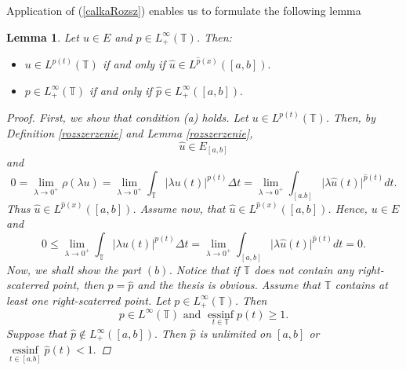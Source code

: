 \documentclass[12pt,a4paper,oneside,titlepage]{article}
\newtheorem{Lemat}{Lemma}
\newcommand{\essinf}{\operatorname{essinf}\limits}
\begin{document}
\smallskip
\begin{flushleft}
Application of (\ref{calkaRozsz}) enables us to formulate the following lemma
\end{flushleft}
\begin{Lemat} Let $u \in E$ and $p \in L^{\infty}_{+}(\mathbb{T})$. Then:
\begin{itemize}
\item[(a)] $u \in L^{p(t)}(\mathbb{T}) $ if and only if $ \widehat{u} \in L^{\widehat{p}(x)}([a,b]). $
\item[(b)] $p \in L^{\infty}_+ (\mathbb{T}) $ if and only if $ \widehat{p} \in L^{\infty}_+([a,b]). $

\end{itemize}

\begin{proof}
First, we show that condition (a) holds. Let $ u \in L^{p(t)}(\mathbb{T}) $. Then, by Definition \ref{rozszerzenie} and Lemma \ref{rozszerzenie},
\begin{equation}
\nonumber
\widehat{u} \in E_{[a,b]}
\end{equation}
 and
\begin{equation}
\nonumber
0 = \lim_{\lambda \rightarrow 0^{+}} \rho(\lambda u ) = \lim_{\lambda \rightarrow 0^{+}} \int_{\mathbb{T}} \vert \lambda u(t) \vert^{p(t)} \Delta t = \lim_{\lambda \rightarrow 0^{+}} \int_{[a.b]} \vert \lambda \widehat{u}(t) \vert^{\widehat{p}(t)} dt.
\end{equation}
Thus $\widehat{u} \in L^{\widehat{p}(x)}([a,b])$. 
Assume now, that $\widehat{u} \in L^{\widehat{p}(x)}([a,b]) $. Hence, $u \in E$ and 
\begin{equation}
\nonumber
0 \leq \lim_{\lambda \rightarrow 0^{+}} \int_{\mathbb{T}} \vert \lambda u(t) \vert^{p(t)} \Delta t =
\lim_{\lambda \rightarrow 0^{+}} \int_{[a,b]} \vert \lambda \widehat{u}(t) \vert^{\widehat{p}(t)} dt = 0. 
\end{equation} 
\indent
Now, we shall show the part $(b)$. Notice that if $\mathbb{T}$ does not contain any right-scaterred point, then $p=\widehat{p}$ and the thesis is obvious. Assume that $\mathbb{T}$ contains at least one right-scaterred point. Let $p \in L^{\infty}_{+}(\mathbb{T})$. Then 
\begin{equation}
\nonumber
p \in L^{\infty}(\mathbb{T}) \text{ and } \essinf_{t \in \mathbb{T}} p(t) \geq 1.
\end{equation}
Suppose that $\widehat{p} \notin L^{\infty}_{+}([a,b]).$ Then $\widehat{p}$  is unlimited on  $[a,b]$  or 
$\essinf_{t \in [a.b]}\widehat{p}(t)<1.$

\end{proof}
\end{Lemat}
\end{document}
